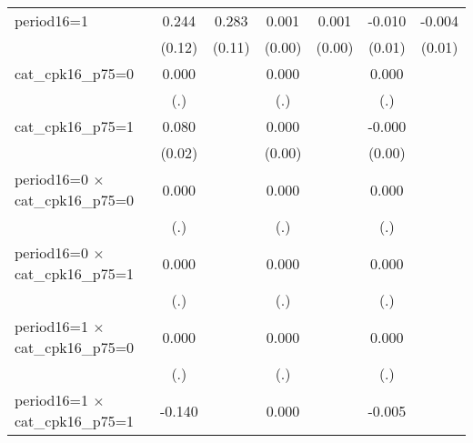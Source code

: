 {\begin{tabular}{l*{6}{c}}
period16=1          &       0.244\sym{*}  &       0.283\sym{*}  &       0.001         &       0.001         &      -0.010         &      -0.004         \\
                    &      (0.12)         &      (0.11)         &      (0.00)         &      (0.00)         &      (0.01)         &      (0.01)         \\
cat\_cpk16\_p75=0     &       0.000         &                     &       0.000         &                     &       0.000         &                     \\
                    &         (.)         &                     &         (.)         &                     &         (.)         &                     \\
cat\_cpk16\_p75=1     &       0.080\sym{***}&                     &       0.000\sym{*}  &                     &      -0.000         &                     \\
                    &      (0.02)         &                     &      (0.00)         &                     &      (0.00)         &                     \\
period16=0 $\times$ cat\_cpk16\_p75=0&       0.000         &                     &       0.000         &                     &       0.000         &                     \\
                    &         (.)         &                     &         (.)         &                     &         (.)         &                     \\
period16=0 $\times$ cat\_cpk16\_p75=1&       0.000         &                     &       0.000         &                     &       0.000         &                     \\
                    &         (.)         &                     &         (.)         &                     &         (.)         &                     \\
period16=1 $\times$ cat\_cpk16\_p75=0&       0.000         &                     &       0.000         &                     &       0.000         &                     \\
                    &         (.)         &                     &         (.)         &                     &         (.)         &                     \\
period16=1 $\times$ cat\_cpk16\_p75=1&      -0.140\sym{***}&                     &       0.000         &                     &      -0.005\sym{*}  &                     \\

\end{tabular}}
